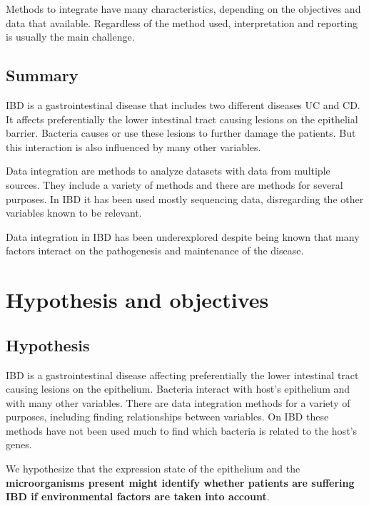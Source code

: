 \documentclass[
  12pt,
  a4paper,
  twoside,
  openright]{book}
\begin{document}
Methods to integrate have many characteristics, depending on the objectives and data that available.
Regardless of the method used, interpretation and reporting is usually the main challenge.

\hypertarget{summary}{%
\section{Summary}\label{summary}}

IBD is a gastrointestinal disease that includes two different diseases UC and CD.
It affects preferentially the lower intestinal tract causing lesions on the epithelial barrier.
Bacteria causes or use these lesions to further damage the patients.
But this interaction is also influenced by many other variables.

Data integration are methods to analyze datasets with data from multiple sources.
They include a variety of methods and there are methods for several purposes.
In IBD it has been used mostly sequencing data, disregarding the other variables known to be relevant.

Data integration in IBD has been underexplored despite being known that many factors interact on the pathogenesis and maintenance of the disease.

\hypertarget{hypothesis-and-objectives}{%
\chapter{Hypothesis and objectives}\label{hypothesis-and-objectives}}

\hypertarget{hypothesis}{%
\section{Hypothesis}\label{hypothesis}}

IBD is a gastrointestinal disease affecting preferentially the lower intestinal tract causing lesions on the epithelium.
Bacteria interact with host's epithelium and with many other variables.
There are data integration methods for a variety of purposes, including finding relationships between variables.
On IBD these methods have not been used much to find which bacteria is related to the host's genes.

We hypothesize that the expression state of the epithelium and the \textbf{microorganisms present might identify whether patients are suffering IBD if environmental factors are taken into account}.
\end{document}
